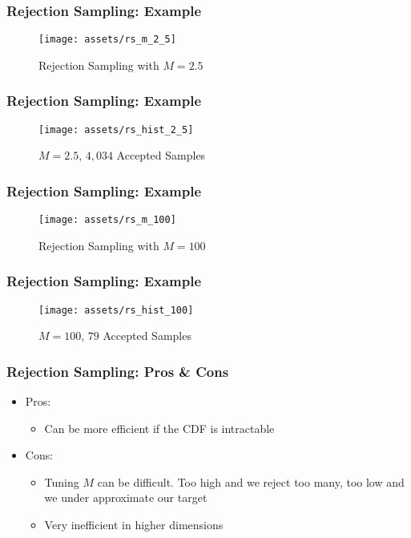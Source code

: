 \documentclass{beamer}
\begin{document}
\begin{frame}
  \frametitle{Rejection Sampling: Example}
  \begin{figure}
    \centering
    \texttt{[image: assets/rs\_m\_2\_5]}
    \caption{Rejection Sampling with $M = 2.5$}
  \end{figure}
\end{frame}

\begin{frame}
  \frametitle{Rejection Sampling: Example}
  \begin{figure}
    \centering
    \texttt{[image: assets/rs\_hist\_2\_5]}
    \caption{$M = 2.5$, $4,034$ Accepted Samples}
  \end{figure}
\end{frame}

\begin{frame}
  \frametitle{Rejection Sampling: Example}
  \begin{figure}
    \centering
    \texttt{[image: assets/rs\_m\_100]}
    \caption{Rejection Sampling with $M = 100$}
  \end{figure}
\end{frame}

\begin{frame}
  \frametitle{Rejection Sampling: Example}
  \begin{figure}
    \centering
    \texttt{[image: assets/rs\_hist\_100]}
    \caption{$M = 100$, $79$ Accepted Samples}
  \end{figure}
\end{frame}


\begin{frame}
  \frametitle{Rejection Sampling: Pros \& Cons}
  \begin{itemize}
    \item Pros:
    \begin{itemize}
      \item Can be more efficient if the CDF is intractable
    \end{itemize}
    \item Cons:
    \begin{itemize}
      \item Tuning $M$ can be difficult. Too high and we reject too many, too low and
      we under approximate our target
      \item Very inefficient in higher dimensions
    \end{itemize}
  \end{itemize}
\end{frame}
\end{document}
